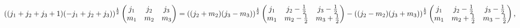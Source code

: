 \[\left((j_{1}+j_{2}+j_{3}+1)(-j_{1}+j_{2}+j_{3})\right)^{\frac{1}{2}}\begin{%
pmatrix}j_{1}&j_{2}&j_{3}\\
m_{1}&m_{2}&m_{3}\end{pmatrix}=\left((j_{2}+m_{2})(j_{3}-m_{3})\right)^{\frac{%
1}{2}}\begin{pmatrix}j_{1}&j_{2}-\frac{1}{2}&j_{3}-\frac{1}{2}\\
m_{1}&m_{2}-\frac{1}{2}&m_{3}+\frac{1}{2}\end{pmatrix}-\left((j_{2}-m_{2})(j_{%
3}+m_{3})\right)^{\frac{1}{2}}\begin{pmatrix}j_{1}&j_{2}-\frac{1}{2}&j_{3}-%
\frac{1}{2}\\
m_{1}&m_{2}+\frac{1}{2}&m_{3}-\frac{1}{2}\end{pmatrix},\]